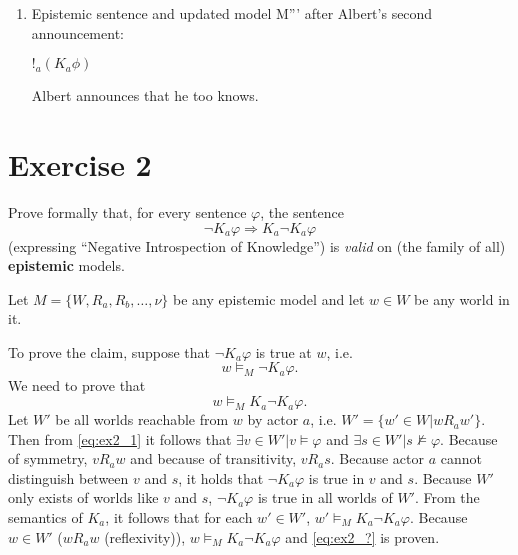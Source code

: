 \documentclass[leqno]{article}
\begin{document}
\begin{enumerate}[label=(\alph*)]
    \item Epistemic sentence and updated model M''' after Albert's second announcement:
    
    $!_a (K_a \phi)$
    
    Albert announces that he too knows.
    
    \begin{center}
    \end{center}

\end{enumerate}

\section{Exercise 2}
Prove formally that, for every sentence \(\varphi\), the sentence
\[\neg K_{a}\varphi \Rightarrow K_{a}\neg K_{a}\varphi\]
(expressing ``Negative Introspection of Knowledge'') is \textit{valid} on (the family of all) \textbf{epistemic} models.

Let $M = \{W, R_a, R_b, \dots, \nu\}$ be any epistemic model and let $w \in W$ be any world in it.

To prove the claim, suppose that $\neg K_a \varphi$ is true at $w$, i.e.
\begin{equation}
	\tag{1} \label{eq:ex2_1}
	w \models_M \neg K_a \varphi.
\end{equation}
We need to prove that
\begin{equation}
	\tag{?} \label{eq:ex2_?}
	w \models_M K_a \neg K_a \varphi.
\end{equation}
Let $W'$ be all worlds reachable from $w$ by actor $a$, i.e. $W' = \{w' \in W| w R_a w'\}$. Then from \eqref{eq:ex2_1} it follows that $\exists v \in W'| v \models \varphi$ and $\exists s \in W'| s \not \models \varphi$. Because of symmetry, $v R_a w$ and because of transitivity, $v R_a s$. Because actor $a$ cannot distinguish between $v$ and $s$, it holds that $\neg K_a \varphi$ is true in $v$ and $s$. Because $W'$ only exists of worlds like $v$ and $s$, $\neg K_a \varphi$ is true in all worlds of $W'$. From the semantics of $K_a$, it follows that for each $w' \in W'$, $w' \models_M K_a \neg K_a \varphi$. Because $w \in W'$ ($w R_a w$ (reflexivity)), $w \models_M K_a \neg K_a \varphi$ and \eqref{eq:ex2_?} is proven.
\end{document}
